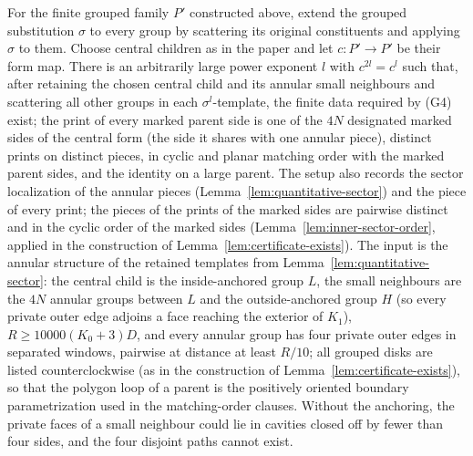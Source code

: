 \begin{lemma}
\label{lem:routing}
For the finite grouped family $P'$ constructed above, extend the grouped
substitution $\sigma$ to every group by scattering its original
constituents and applying $\sigma$ to them.  Choose central children as
in the paper and let $c:P'\to P'$ be their form map.  There is an
arbitrarily large power exponent $l$ with $c^{2l}=c^l$ such that, after
retaining the chosen central child and its annular small neighbours and
scattering all other groups in each $\sigma^l$-template, the finite data
required by (G4) exist; the print of every marked parent side is one of the
$4N$ designated marked sides of the central form (the side it shares with one
annular piece), distinct prints on distinct pieces, in cyclic and planar
matching order with the marked parent sides, and the identity on a large
parent.  The setup also records the sector localization of the annular
pieces (Lemma~\ref{lem:quantitative-sector}) and the piece of every print;
the pieces of the prints of the marked sides are pairwise distinct and in
the cyclic order of the marked sides (Lemma~\ref{lem:inner-sector-order},
applied in the construction of Lemma~\ref{lem:certificate-exists}).  The
input is the annular structure of the retained
templates from Lemma~\ref{lem:quantitative-sector}: the central child is the
inside-anchored group $L$, the small neighbours are the $4N$ annular groups
between $L$ and the outside-anchored group $H$ (so every private outer edge
adjoins a face reaching the exterior of $K_1$), $R\ge10000(K_0+3)D$, and
every annular group has four private outer edges in separated windows,
pairwise at distance at least $R/10$; all grouped disks are listed
counterclockwise (as in the construction of
Lemma~\ref{lem:certificate-exists}), so that the polygon loop of a parent
is the positively oriented boundary parametrization used in the
matching-order clauses.  Without the anchoring, the private
faces of a small neighbour could lie in cavities closed off by fewer than
four sides, and the four disjoint paths cannot exist.
\end{lemma}

